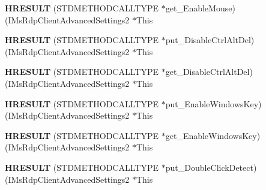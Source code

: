 \begin{DoxyCompactItemize}
\mbox{\label{struct_i_ms_rdp_client_advanced_settings2_vtbl_aec901396c4a5bb1f34bbfebd4c372e2f}} 
{\bfseries H\+R\+E\+S\+U\+LT} (S\+T\+D\+M\+E\+T\+H\+O\+D\+C\+A\+L\+L\+T\+Y\+PE $\ast$get\+\_\+\+Enable\+Mouse)(I\+Ms\+Rdp\+Client\+Advanced\+Settings2 $\ast$This
\item 
\mbox{\label{struct_i_ms_rdp_client_advanced_settings2_vtbl_a64b5f2569c72daf40755b3b54814c7a9}} 
{\bfseries H\+R\+E\+S\+U\+LT} (S\+T\+D\+M\+E\+T\+H\+O\+D\+C\+A\+L\+L\+T\+Y\+PE $\ast$put\+\_\+\+Disable\+Ctrl\+Alt\+Del)(I\+Ms\+Rdp\+Client\+Advanced\+Settings2 $\ast$This
\item 
\mbox{\label{struct_i_ms_rdp_client_advanced_settings2_vtbl_a40ebd54bc57d2d854bd9e394c4ebe3be}} 
{\bfseries H\+R\+E\+S\+U\+LT} (S\+T\+D\+M\+E\+T\+H\+O\+D\+C\+A\+L\+L\+T\+Y\+PE $\ast$get\+\_\+\+Disable\+Ctrl\+Alt\+Del)(I\+Ms\+Rdp\+Client\+Advanced\+Settings2 $\ast$This
\item 
\mbox{\label{struct_i_ms_rdp_client_advanced_settings2_vtbl_aa9c2a6899707e47bbf993dcf89819045}} 
{\bfseries H\+R\+E\+S\+U\+LT} (S\+T\+D\+M\+E\+T\+H\+O\+D\+C\+A\+L\+L\+T\+Y\+PE $\ast$put\+\_\+\+Enable\+Windows\+Key)(I\+Ms\+Rdp\+Client\+Advanced\+Settings2 $\ast$This
\item 
\mbox{\label{struct_i_ms_rdp_client_advanced_settings2_vtbl_a0acdb14cf51c4dfdcaa9ad806d879c19}} 
{\bfseries H\+R\+E\+S\+U\+LT} (S\+T\+D\+M\+E\+T\+H\+O\+D\+C\+A\+L\+L\+T\+Y\+PE $\ast$get\+\_\+\+Enable\+Windows\+Key)(I\+Ms\+Rdp\+Client\+Advanced\+Settings2 $\ast$This
\item 
\mbox{\label{struct_i_ms_rdp_client_advanced_settings2_vtbl_a1eb6f9a67d7b92de68c3c949cc553b64}} 
{\bfseries H\+R\+E\+S\+U\+LT} (S\+T\+D\+M\+E\+T\+H\+O\+D\+C\+A\+L\+L\+T\+Y\+PE $\ast$put\+\_\+\+Double\+Click\+Detect)(I\+Ms\+Rdp\+Client\+Advanced\+Settings2 $\ast$This
\item 
\mbox{\label{struct_i_ms_rdp_client_advanced_settings2_vtbl_a186757898c356ea733ab61ff4303d302}} 

\end{DoxyCompactItemize}
